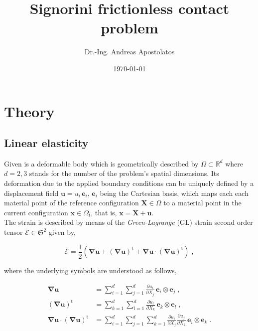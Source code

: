 \documentclass[10pt,a4paper]{article}
\title{Signorini frictionless contact problem}
\author{Dr.-Ing. Andreas Apostolatos}
\date{\today}
\begin{document}
\maketitle

\section{Theory}\label{sec:variational_formulation}

\subsection{Linear elasticity}\label{subsec:linear_elasticity}

Given is a deformable body which is geometrically described by $\Omega \subset \mathbb{R}^d$ where $d = 2,3$ stands for the number of the problem's spatial dimensions. Its deformation due to the applied boundary conditions can be uniquely defined by a displacement field $\mathbf{u} = u_i \, \mathbf{e}_i$, $\mathbf{e}_i$ being the Cartesian basis, which maps each each material point of the reference configuration $\mathbf{X} \in \Omega$ to a material point in the current configuration $\mathbf{x} \in \Omega_t$, that is, $\mathbf{x} = \mathbf{X} + \mathbf{u}$.\\

The strain is described by means of the \textit{Green-Lagrange} (GL) strain second order tensor $\boldsymbol{\mathcal{E}} \in \mathfrak{S}^2$ given by,

\begin{equation}
	\boldsymbol{\mathcal{E}} = \frac{1}{2} \left( \boldsymbol{\nabla} \mathbf{u} + \left( \boldsymbol{\nabla} \mathbf{u} \right)^{\text{t}} +  \boldsymbol{\nabla} \mathbf{u} \cdot \left( \boldsymbol{\nabla} \mathbf{u} \right)^{\text{t}} \right) \;, \label{eq:GL_strain}
\end{equation}

where the underlying symbols are understood as follows,

\begin{subequations}
	\begin{alignat}{1}
		\boldsymbol{\nabla} \mathbf{u} &= \sum_{i = 1}^d \sum_{j = 1}^d \frac{\partial u_i}{\partial X_j} \, \mathbf{e}_i \otimes \mathbf{e}_j \;, \label{eq:nabla_u} \\
		\left( \boldsymbol{\nabla} \mathbf{u} \right)^{\text{t}} &= \sum_{k = 1}^d \sum_{l = 1}^d \frac{\partial u_l}{\partial X_k} \, \mathbf{e}_k \otimes \mathbf{e}_l \;, \label{eq:nabla_u_t} \\
		\boldsymbol{\nabla} \mathbf{u} \cdot \left( \boldsymbol{\nabla} \mathbf{u} \right)^{\text{t}} &= \sum_{i = 1}^d \sum_{j = 1}^d \sum_{k = 1}^d \frac{\partial u_i}{\partial X_j} \frac{\partial u_j}{\partial X_k} \, \mathbf{e}_i \otimes \mathbf{e}_k \;. \label{eq:nabla_u_times_u_t}
	\end{alignat}
\end{subequations}
\end{document}
